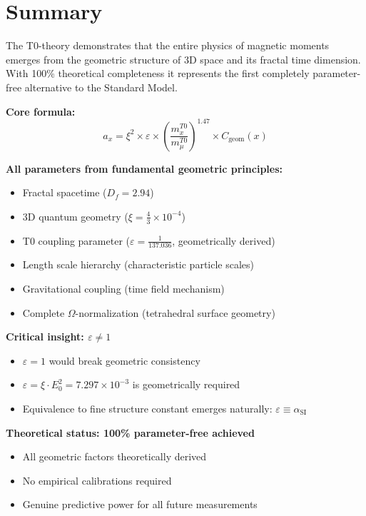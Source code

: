 \documentclass[12pt,a4paper]{article}
\numberwithin{equation}{section}
\newcommand{\xipar}{\xi}
\newcommand{\epsilonT}{\varepsilon}
\newcommand{\alphaSI}{\alpha_{\text{SI}}}
\newcommand{\Cgeom}{C_{\text{geom}}}
\newcommand{\Df}{D_f}
\newcommand{\Eo}{E_0}
\newcommand{\Omegafactor}{\Omega}
\begin{document}
	
	\section{Summary}
	
	The T0-theory demonstrates that the entire physics of magnetic moments emerges from the geometric structure of 3D space and its fractal time dimension. With 100\% theoretical completeness it represents the first completely parameter-free alternative to the Standard Model.
	
	\textbf{Core formula:}
	\begin{equation}
		a_x = \xipar^2 \times \epsilonT \times \left(\frac{m_x^{T0}}{m_\mu^{T0}}\right)^{1.47} \times \Cgeom(x)
		\label{eq:core_formula}
	\end{equation}
	
	\textbf{All parameters from fundamental geometric principles:}
	\begin{itemize}
		\item Fractal spacetime ($\Df = 2.94$)
		\item 3D quantum geometry ($\xipar = \frac{4}{3} \times 10^{-4}$)
		\item T0 coupling parameter ($\epsilonT = \frac{1}{137.036}$, geometrically derived)
		\item Length scale hierarchy (characteristic particle scales)
		\item Gravitational coupling (time field mechanism)
		\item Complete $\Omegafactor$-normalization (tetrahedral surface geometry)
	\end{itemize}
	
	\textbf{Critical insight: $\epsilonT \neq 1$}
	\begin{itemize}
		\item $\epsilonT = 1$ would break geometric consistency
		\item $\epsilonT = \xipar \cdot \Eo^2 = 7.297 \times 10^{-3}$ is geometrically required
		\item Equivalence to fine structure constant emerges naturally: $\epsilonT \equiv \alphaSI$
	\end{itemize}
	
	\textbf{Theoretical status: 100\% parameter-free achieved}
	\begin{itemize}
		\item All geometric factors theoretically derived
		\item No empirical calibrations required
		\item Genuine predictive power for all future measurements
	\end{itemize}
	
\end{document}
